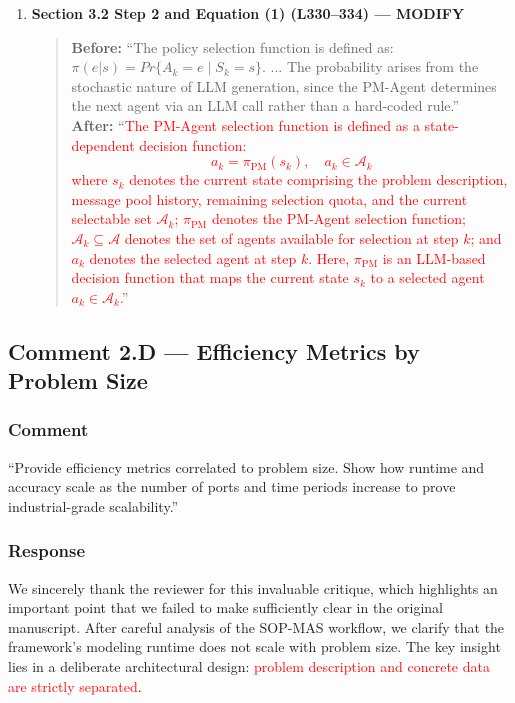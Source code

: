 \documentclass[11pt,a4paper]{article}
\begin{document}
\begin{enumerate}
\item \textbf{Section 3.2 Step 2 and Equation (1) (L330--334) --- MODIFY}
\begin{quote}
\textbf{Before:} ``The policy selection function is defined as: $\pi(e|s)=Pr\{A_k=e \mid S_k=s\}$. ... The probability arises from the stochastic nature of LLM generation, since the PM-Agent determines the next agent via an LLM call rather than a hard-coded rule.''\\[4pt]
\textbf{After:} ``\textcolor{red}{The PM-Agent selection function is defined as a state-dependent decision function:
\begin{equation}\label{eq:pm-selection-revised}
a_k=\pi_{\mathrm{PM}}\left(s_k\right), \quad a_k\in\mathcal{A}_k
\end{equation}
where $s_k$ denotes the current state comprising the problem description, message pool history, remaining selection quota, and the current selectable set $\mathcal{A}_k$; $\pi_{\mathrm{PM}}$ denotes the PM-Agent selection function; $\mathcal{A}_k \subseteq \mathcal{A}$ denotes the set of agents available for selection at step $k$; and $a_k$ denotes the selected agent at step $k$. Here, $\pi_{\mathrm{PM}}$ is an LLM-based decision function that maps the current state $s_k$ to a selected agent $a_k \in \mathcal{A}_k$.}''
\end{quote}
\end{enumerate}

\subsection{Comment 2.D --- Efficiency Metrics by Problem Size}

\subsubsection{Comment}
``Provide efficiency metrics correlated to problem size. Show how runtime and accuracy scale as the number of ports and time periods increase to prove industrial-grade scalability.''

\subsubsection{Response}
We sincerely thank the reviewer for this invaluable critique, which highlights an important point that we failed to make sufficiently clear in the original manuscript. After careful analysis of the SOP-MAS workflow, we clarify that the framework's modeling runtime does not scale with problem size. The key insight lies in a deliberate architectural design: \textcolor{red}{problem description and concrete data are strictly separated}.
\end{document}

